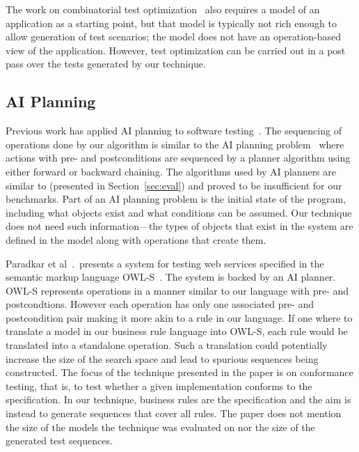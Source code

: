The work on combinatorial test optimization~\cite{segall2012} also requires a model 
of an application as a starting point, but that model is typically not rich
enough to allow generation of test scenarios; the model does not have an operation-based
view of the application.   However, test optimization 
can be carried out in a post pass over the tests generated by our technique.

\subsection{AI Planning}

Previous work has applied AI planning to software
testing~\cite{Scheetz99ai,Howe97testcase}. The sequencing of
operations done by our algorithm is similar to the AI planning
problem~\cite{Weld94} where actions with pre- and postconditions are sequenced
by a planner algorithm using either forward or backward chaining. The
algorithms used by AI planners are similar to \exhaust{}
(presented in Section~\ref{sec:eval}) and proved to be insufficient for our
benchmarks. Part of an AI planning problem is the initial state of the program,
including what objects exist and what conditions can be
assumed. Our technique does not need such information---the types of objects that
exist in the system are defined in the model along with operations
that create them. 

Paradkar et al~\cite{conf/icws/ParadkarSWJOSL07}.\ presents a system
for testing web services specified in the semantic markup language
OWL-S~\cite{owls}. The system is backed by an AI planner. OWL-S represents
operations in a manner similar to our language with pre- and
postcondtions. However each operation has only one associated pre- and
postcondition pair making it more akin to a rule in our language. If
one where to translate a model in our business rule language into
OWL-S, each rule would be translated into a standalone operation. Such
a translation could potentially increase the size of the search space
and lead to spurious sequences being constructed. The focus of the
technique presented in the paper is on conformance testing, that is,
to test whether a given implementation conforms to the specification. In
our technique, business rules are the specification and the aim is
instead to generate sequences that cover all rules. The paper does not
mention the size of the models the technique was evaluated on nor the
size of the generated test sequences.


